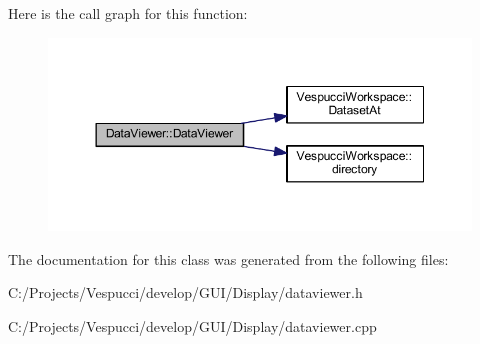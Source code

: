 Here is the call graph for this function\+:\nopagebreak
\begin{figure}[H]
\begin{center}
\leavevmode
\includegraphics[width=350pt]{class_data_viewer_a661ade0bbf91ea10ab4ea1e718062c91_cgraph}
\end{center}
\end{figure}




The documentation for this class was generated from the following files\+:\begin{DoxyCompactItemize}
\item 
C\+:/\+Projects/\+Vespucci/develop/\+G\+U\+I/\+Display/dataviewer.\+h\item 
C\+:/\+Projects/\+Vespucci/develop/\+G\+U\+I/\+Display/dataviewer.\+cpp\end{DoxyCompactItemize}
